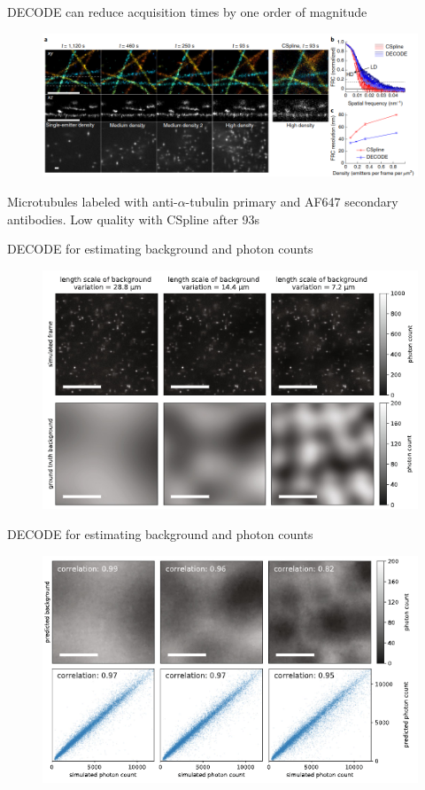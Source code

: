\documentclass{beamer}			%
\begin{document}
\begin{frame}{DECODE can reduce acquisition times by one order of magnitude}
\begin{figure}
\includegraphics[width=13cm]{decode/Figure-4.png}
\end{figure}
Microtubules labeled with anti-$\alpha$-tubulin primary and AF647 secondary antibodies. Low quality with CSpline after 93s
\end{frame}

\begin{frame}{DECODE for estimating background and photon counts}
\begin{figure}
\includegraphics[width=13cm]{decode/Figure-5-1.png}
\end{figure}
\end{frame}


\begin{frame}{DECODE for estimating background and photon counts}
\begin{figure}
\includegraphics[width=13cm]{decode/Figure-5-2.png}
\end{figure}
\end{frame}
\end{document}
